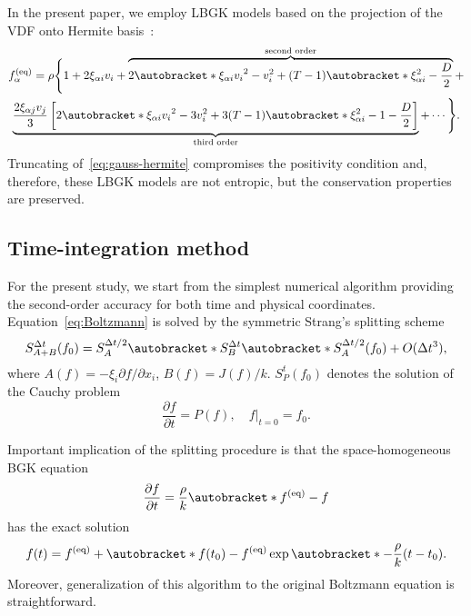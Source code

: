 \documentclass{article}
\newcommand{\pder}[2][]{\frac{\partial#1}{\partial#2}}
\newcommand{\Pder}[2][]{\partial#1/\partial#2}
\newcommand{\OO}[1]{O(#1)}
\DeclarePairedDelimiter\autobracket()       %
\newcommand{\br}[1]{\autobracket*{#1}}
\newcommand{\xiai}{\xi_{\alpha i}}
\newcommand{\xiaj}{\xi_{\alpha j}}
\newcommand{\equil}[1]{#1^\mathrm{(eq)}}
\begin{document}
In the present paper, we employ LBGK models based on the projection of the VDF onto Hermite basis~\cite{Shan2006}:
\begin{multline}\label{eq:gauss-hermite}
    \equil{f}_\alpha = \rho\Bigg\{ 1 + 2\xiai v_i + \overbrace{
        2\br{\xiai v_i}^2 - v_i^2 + (T-1)\br{\xiai^2 - \frac{D}2}
    }^\text{second order} + \\ \underbrace{
        \frac{2\xiaj v_j}3\left[ 2\br{\xiai v_i}^2 - 3v_i^2 + 3(T-1)\br{\xiai^2 - 1 - \frac{D}2}\right]
    }_\text{third order} + \cdots \Bigg\}.
\end{multline}
Truncating of~\eqref{eq:gauss-hermite} compromises the positivity condition and,
therefore, these LBGK models are not entropic, but the conservation properties are preserved.

\subsection{Time-integration method}\label{sec:splitting}

For the present study, we start from the simplest numerical algorithm providing the second-order accuracy
for both time and physical coordinates.
Equation~\eqref{eq:Boltzmann} is solved by the symmetric Strang's splitting scheme~\cite{Bobylev2001}
\begin{equation}\label{eq:Strang}
    S^{\Delta{t}}_{A+B}(f_0) = S^{\Delta{t}/2}_A \br{S^{\Delta{t}}_B \br{S^{\Delta{t}/2}_A(f_0)} } + \OO{\Delta{t}^3},
\end{equation}
where \(A(f) = -\xi_i\Pder[f]{x_i}\), \(B(f) = J(f)/k\).
\(S^t_P (f_0)\) denotes the solution of the Cauchy problem
\begin{equation}\label{eq:Cauchy}
    \pder[f]{t} = P(f), \quad f|_{t=0} = f_0.
\end{equation}

Important implication of the splitting procedure is that the space-homogeneous BGK equation
\begin{equation}\label{eq:bgk_homogeneous}
    \pder[f]{t} = \frac{\rho}k \br{\equil{f}-f}
\end{equation}
has the exact solution
\begin{equation}\label{eq:bgk_exact}
    f(t) = \equil{f} + \br{f(t_0)-\equil{f}}\exp\br{-\frac{\rho}k (t-t_0)}.
\end{equation}
Moreover, generalization of this algorithm to the original Boltzmann equation is straightforward.
\end{document}
